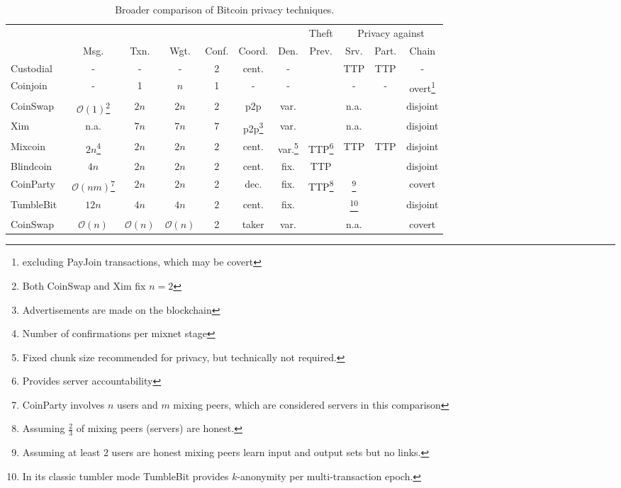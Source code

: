 \documentclass[a4paper]{article}
\renewcommand*{\thefootnote}{\arabic{footnote}}
\newcommand{\cmark}{\ding{51}}%
\newcommand{\xmark}{\ding{55}}%
\begin{document}
\begin{table}[h!]
\begin{minipage}{\textwidth}
\renewcommand{\thempfootnote}{\fnsymbol{mpfootnote}}
\renewcommand{\thefootnote}{\thempfootnote} %
\centering
\begin{tabular}{lcccccccccc}
	&&&&&&& Theft & \multicolumn{3}{c}{Privacy against} \\
	&Msg. & Txn. & Wgt. & Conf. & Coord. & Den. & Prev. & Srv. & Part. & Chain \\

	Custodial & - & - & - & 2 & cent. & - & \xmark & TTP & TTP & - \\
	Coinjoin~\cite{maxwell2013coinjoin} & - & 1 & $n$ & 1 & - & - & \cmark & - & - & overt\footnote{excluding PayJoin transactions, which may be covert} \\
	CoinSwap~\cite{maxwell2013coinswap} & $\mathcal{O}(1)$\footnote{Both CoinSwap and Xim fix $n=2$} & $2n$\footnotemark[\value{footnote}] & $2n$\footnotemark[\value{footnote}] & $2$ & p2p & var. & \cmark & n.a. & \xmark & disjoint \\
	Xim~\cite{bissias2014sybil} & n.a. & $7n$\footnotemark[\value{footnote}] & $7n$\footnotemark[\value{footnote}] & $7$ &  p2p\footnote{Advertisements are made on the blockchain} & var. & \cmark & n.a. & \xmark & disjoint \\
	Mixcoin~\cite{bonneau2014mixcoin} & $2n$\footnote{Number of confirmations per mixnet stage} & $2n$\footnotemark[\value{footnote}] & $2n$\footnotemark[\value{footnote}] & $2$\footnotemark[\value{footnote}] & cent. & var.\footnote{Fixed chunk size recommended for privacy, but technically not required.} & TTP\footnote{Provides server accountability} & TTP & TTP & disjoint \\
	Blindcoin~\cite{valenta2015blindcoin} & $4n$ & $2n$ & $2n$ & $2$ & cent. & fix. & TTP\footnotemark[\value{footnote}] & \cmark & \cmark & disjoint \\
	CoinParty~\cite{ziegeldorf2015coinparty}& $\mathcal{O}(n m)$\footnote{CoinParty involves $n$ users and $m$ mixing peers, which are considered servers in this comparison} & $2n$ & $2n$ & 2 & dec.\footnotemark[\value{footnote}] & fix. & TTP\footnote{Assuming $\frac{2}{3}$ of mixing peers (servers) are honest.} & \cmark\footnote{Assuming at least 2 users are honest mixing peers learn input and output sets but no links.} & \cmark & covert \\
	TumbleBit~\cite{heilman2017tumblebit} & $12n$ & $4n$ & $4n$ & $2$ & cent. & fix. & \cmark & \cmark\footnote{In its classic tumbler mode TumbleBit provides $k$-anonymity per multi-transaction epoch.} & \cmark & disjoint \\
	CoinSwap\cite{belcher2020design} & $\mathcal{O}(n)$ & $\mathcal{O}(n)$ & $\mathcal{O}(n)$ & 2 & taker & var. & \cmark & n.a. & \cmark & covert \\
\end{tabular}
\end{minipage}
\caption{Broader comparison of Bitcoin privacy techniques.}
\label{table:noncoinjoin}
\end{table}
\end{document}
